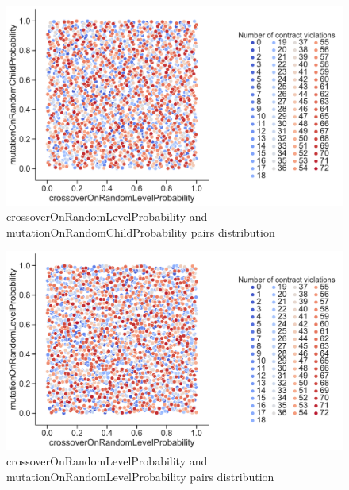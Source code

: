 \begin{figure}
	\centering
	\includegraphics[width=\textwidth]{images/PairsDistr/crossoverOnRandomLevelProbability_mutationOnRandomChildProbability.pdf}
	\caption[crossoverOnRandomLevelProbability and mutationOnRandomChildProbability pairs distribution]{crossoverOnRandomLevelProbability and mutationOnRandomChildProbability pairs distribution}
	\label{fig:crossoverOnRandomLevelProbability_mutationOnRandomChildProbability_pair}
\end{figure}
\clearpage
\begin{figure}
	\centering
	\includegraphics[width=\textwidth]{images/PairsDistr/crossoverOnRandomLevelProbability_mutationOnRandomLevelProbability.pdf}
	\caption[crossoverOnRandomLevelProbability and mutationOnRandomLevelProbability pairs distribution]{crossoverOnRandomLevelProbability and mutationOnRandomLevelProbability pairs distribution}
	\label{fig:crossoverOnRandomLevelProbability_mutationOnRandomLevelProbability_pair}
\end{figure}
\clearpage
